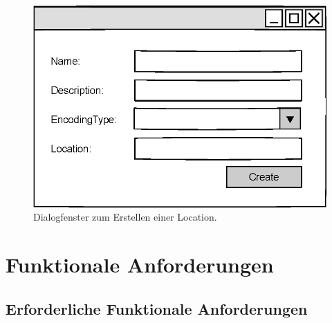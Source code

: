 \documentclass[a4paper, 12 pt]{article}
\begin{document}
\begin{figure}[htbp]
\centering
\includegraphics[scale=1]{images/loc}
\caption{\label{fig:loc}Dialogfenster zum Erstellen einer Location.}
\end{figure}

\section{Funktionale Anforderungen}
\subsection{Erforderliche Funktionale Anforderungen}
	
\end{document}
